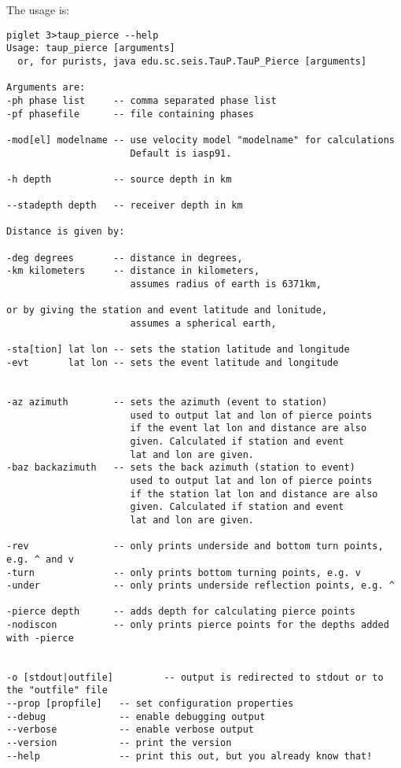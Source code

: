 The usage is:
\begin{verbatim}
piglet 3>taup_pierce --help
Usage: taup_pierce [arguments]
  or, for purists, java edu.sc.seis.TauP.TauP_Pierce [arguments]

Arguments are:
-ph phase list     -- comma separated phase list
-pf phasefile      -- file containing phases

-mod[el] modelname -- use velocity model "modelname" for calculations
                      Default is iasp91.

-h depth           -- source depth in km

--stadepth depth   -- receiver depth in km

Distance is given by:

-deg degrees       -- distance in degrees,
-km kilometers     -- distance in kilometers,
                      assumes radius of earth is 6371km,

or by giving the station and event latitude and lonitude,
                      assumes a spherical earth,

-sta[tion] lat lon -- sets the station latitude and longitude
-evt       lat lon -- sets the event latitude and longitude


-az azimuth        -- sets the azimuth (event to station)
                      used to output lat and lon of pierce points
                      if the event lat lon and distance are also
                      given. Calculated if station and event
                      lat and lon are given.
-baz backazimuth   -- sets the back azimuth (station to event)
                      used to output lat and lon of pierce points
                      if the station lat lon and distance are also
                      given. Calculated if station and event
                      lat and lon are given.

-rev               -- only prints underside and bottom turn points, e.g. ^ and v
-turn              -- only prints bottom turning points, e.g. v
-under             -- only prints underside reflection points, e.g. ^

-pierce depth      -- adds depth for calculating pierce points
-nodiscon          -- only prints pierce points for the depths added with -pierce


-o [stdout|outfile]         -- output is redirected to stdout or to the "outfile" file
--prop [propfile]   -- set configuration properties
--debug             -- enable debugging output
--verbose           -- enable verbose output
--version           -- print the version
--help              -- print this out, but you already know that!
\end{verbatim} 
 
